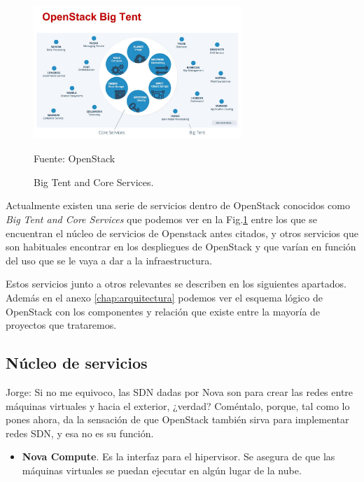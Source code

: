 \begin{figure}
    \centering
    \includegraphics[width=0.7\textwidth]{imagenes/capitulo4/bigtent.png}
    \caption{Big Tent and Core Services.}
	\vspace{0.3cm}
    \footnotesize{Fuente: OpenStack}
    \label{fig:bigtent}
\end{figure}


Actualmente existen una serie de servicios dentro de OpenStack conocidos como \textit{Big Tent and Core Services} que podemos ver en la Fig.\ref{fig:bigtent} entre los que se encuentran el núcleo de servicios de Openstack antes citados, y otros servicios que son habituales encontrar en los despliegues de OpenStack y que varían en función del uso que se le vaya a dar a la infraestructura. 

Estos servicios junto a otros relevantes se describen en los siguientes apartados. Además en el anexo \ref{chap:arquitectura} podemos ver el esquema lógico de OpenStack con los componentes y relación que existe  entre la mayoría de proyectos que trataremos.

\subsection{Núcleo de servicios}

\begin{tcolorbox}[colback=orange!5!white,colframe=orange!75!black]
Jorge: Si no me equivoco, las SDN dadas por Nova son para crear las redes entre máquinas virtuales y hacia el exterior, ¿verdad? Coméntalo, porque, tal como lo pones ahora, da la sensación de que OpenStack también sirva para implementar redes SDN, y esa no es su función.
\end{tcolorbox}

\begin{itemize}
\item \textbf{Nova Compute}. Es la interfaz para el hipervisor. Se asegura de que las máquinas virtuales se puedan ejecutar en algún lugar de la nube.
\end{itemize}

